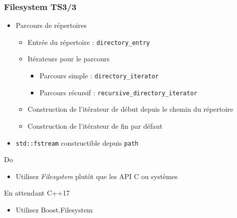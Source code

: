 \documentclass[C++.tex]{subfiles}
\begin{document}
\begin{frame}[fragile]
	\frametitle{Filesystem TS\titlehfill{}3/3}
	\begin{itemize}
		\item Parcours de répertoires
		\begin{itemize}
			\item Entrée du répertoire : \lstinline|directory_entry|
			\item Itérateurs pour le parcours
			\begin{itemize}
				\item Parcours simple : \lstinline|directory_iterator|
				\item Parcours récursif : \lstinline|recursive_directory_iterator|
			\end{itemize}
			\item Construction de l'itérateur de début depuis le chemin du répertoire
			\item Construction de l'itérateur de fin par défaut
		\end{itemize}
		\item \lstinline|std::fstream| constructible depuis \lstinline|path|
	\end{itemize}

	\begin{exampleblock}{Do}
		\begin{itemize}
			\item Utilisez \textit{Filesystem} plutôt que les API C ou systèmes
		\end{itemize}
	\end{exampleblock}

	\begin{block}{En attendant C++17}
		\begin{itemize}
			\item Utilisez Boost.Filesystem
		\end{itemize}

	\end{block}
\end{frame}
\end{document}
